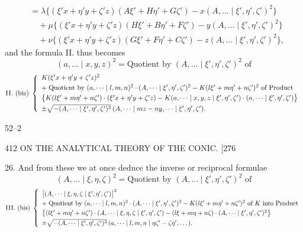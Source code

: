 \documentclass[11pt]{article}
\begin{document}
\[ \begin{aligned}
&= \lambda\bigl\{(\xi' x+\eta' y+\zeta' z)(A\xi'+H\eta'+G\zeta')-x(A,\dots \mid \xi',\eta',\zeta')^{2}\bigr\}\\
&\quad +\mu\bigl\{(\xi' x+\eta' y+\zeta' z)(H\xi'+B\eta'+F\zeta')-y(A,\dots \mid \xi',\eta',\zeta')^{2}\bigr\}\\
&\quad +\nu\bigl\{(\xi' x+\eta' y+\zeta' z)(G\xi'+F\eta'+C\zeta')-z(A,\dots \mid \xi',\eta',\zeta')^{2}\bigr\},
\end{aligned} \]
and the formula \textsc{II.} thus becomes
\[ (a,\dots \mid x,y,z)^{2}=\text{Quotient by }(A,\dots \mid \xi',\eta',\zeta')^{2}\text{ of} \]
\[ \textsc{II.}\;(\text{bis})\;\left\{\begin{array}{l}
K(\xi' x+\eta' y+\zeta' z)^{2}\\[0.3em]
+\;\text{Quotient by }(a,\dots \mid l,m,n)^{2}\cdot(A,\dots \mid \xi',\eta',\zeta')^{2}-K(l\xi'+m\eta'+n\zeta')^{2}\text{ of Product}\\[0.3em]
\bigl\{K(l\xi'+m\eta'+n\zeta')\cdot(\xi' x+\eta' y+\zeta' z)-K(a,\dots \mid x,y,z \mid \xi',\eta',\zeta')\cdot(a,\dots \mid \xi',\eta',\zeta')\bigr\}\\[0.3em]
\pm\sqrt{-(A,\dots \mid \xi',\eta',\zeta')^{2}}\,(A,\dots \mid mz-ny,\dots \mid \xi',\eta',\zeta').
\end{array}\right. \]

\hfill 52--2

\begin{center}
412 \hfill ON THE ANALYTICAL THEORY OF THE CONIC. \hfill \textsc{[276}
\end{center}

\textsc{26.} And from these we at once deduce the inverse or reciprocal formulae
\[ (A,\dots \mid \xi,\eta,\zeta)^{2}=\text{Quotient by }(A,\dots \mid \xi',\eta',\zeta')^{2}\text{ of} \]
\[ \textsc{III.}\;(\text{bis})\;\left\{\begin{array}{l}
\bigl[(A,\dots \mid \xi,\eta,\zeta \mid \xi',\eta',\zeta')\bigr]^{2}\\[0.3em]
+\;\text{Quotient by }(a,\dots \mid l,m,n)^{2}\cdot(A,\dots \mid \xi',\eta',\zeta')^{2}-K(l\xi'+m\eta'+n\zeta')^{2}\text{ of }K\text{ into Product}\\[0.3em]
\bigl\{(l\xi'+m\eta'+n\zeta')\cdot(A,\dots \mid \xi,\eta,\zeta \mid \xi',\eta',\zeta')-(l\xi+m\eta+n\zeta)\cdot(A,\dots \mid \xi',\eta',\zeta')^{2}\bigr\}\\[0.3em]
\pm\sqrt{-(A,\dots \mid \xi',\eta',\zeta')^{2}}\,(a,\dots \mid l,m,n \mid \eta\zeta'-\zeta\eta',\dots).
\end{array}\right. \]
\end{document}
